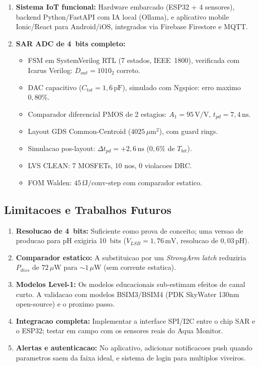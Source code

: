 \documentclass[12pt, a4paper]{article}
\begin{document}
\begin{enumerate}
  \item \textbf{Sistema IoT funcional:} Hardware embarcado (ESP32 + 4 sensores), backend
        Python/FastAPI com IA local (Ollama), e aplicativo mobile Ionic/React para Android/iOS,
        integrados via Firebase Firestore e MQTT.
  \item \textbf{SAR ADC de 4~bits completo:}
  \begin{itemize}
    \item FSM em SystemVerilog RTL (7 estados, IEEE~1800), verificada com Icarus Verilog: $D_{out} = 1010_2$ correto.
    \item DAC capacitivo ($C_{tot} = 1{,}6\,\text{pF}$), simulado com Ngspice: erro maximo $0{,}80\%$.
    \item Comparador diferencial PMOS de 2 estagios: $A_1 = 95\,\text{V/V}$, $t_{pd} = 7{,}4\,\text{ns}$.
    \item Layout GDS Common-Centroid ($4025\,\mu\text{m}^2$), com guard rings.
    \item Simulacao pos-layout: $\Delta t_{pd} = +2{,}6\,\text{ns}$ ($0{,}6\%$ de $T_{bit}$).
    \item LVS CLEAN: 7 MOSFETs, 10 nos, 0 violacoes DRC.
    \item FOM Walden: $45\,\text{fJ/conv-step}$ com comparador estatico.
  \end{itemize}
\end{enumerate}

\subsection{Limitacoes e Trabalhos Futuros}

\begin{enumerate}
  \item \textbf{Resolucao de 4~bits:} Suficiente como prova de conceito; uma versao de
        producao para pH exigiria 10~bits ($V_{LSB} = 1{,}76\,\text{mV}$, resolucao de $0{,}03\,\text{pH}$).
  \item \textbf{Comparador estatico:} A substituicao por um \textit{StrongArm latch} reduziria
        $P_{diss}$ de $72\,\mu\text{W}$ para $\sim1\,\mu\text{W}$ (sem corrente estatica).
  \item \textbf{Modelos Level-1:} Os modelos educacionais sub-estimam efeitos de canal curto.
        A validacao com modelos BSIM3/BSIM4 (PDK SkyWater 130nm open-source) e o proximo passo.
  \item \textbf{Integracao completa:} Implementar a interface SPI/I2C entre o chip SAR e o ESP32;
        testar em campo com os sensores reais do Aqua Monitor.
  \item \textbf{Alertas e autenticacao:} No aplicativo, adicionar notificacoes push quando
        parametros saem da faixa ideal, e sistema de login para multiplos viveiros.
\end{enumerate}
\end{document}
